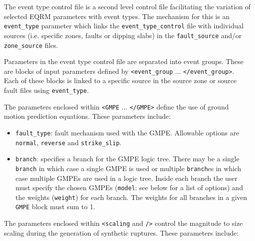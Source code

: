 The event type control file is a second level control file
facilitating the variation of selected EQRM parameters with event
types. The mechanism for this is an \texttt{event\_type} parameter
which links the \texttt{event\_type\_control} file with individual
sources (i.e. specific zones, faults or dipping slabs) in the
\texttt{fault\_source} and/or \texttt{zone\_source} files.


Parameters in the event type control file are separated into event
groups. These are blocks of input parameters defined by
\texttt{<event\_group} ... \texttt{</event\_group>}. Each of these
blocks is linked to a specific source in the source zone or source
fault files using \texttt{event\_type}.

The parameters enclosed within \texttt{<GMPE} ... \texttt{</GMPE>}
define the use of ground motion prediction equations. These
parameters include:
\begin{itemize}
\item \texttt{fault\_type}: fault mechanism used with the GMPE.
Allowable options are \texttt{normal}, \texttt{reverse} and
\texttt{strike\_slip}.
\item \texttt{branch}: specifies a branch for the GMPE logic tree.
There may be a single \texttt{branch} in which case a single GMPE is
used or multiple \texttt{branch}es in which case multiple GMPEs are
used in a logic tree. Inside each branch the user must specify the
chosen GMPEs (\texttt{model}: see below for a list of options) and
the weights (\texttt{weight}) for each branch. The weights
for all branches in a given \texttt{GMPE} block must sum to 1.
\end{itemize}

The parameters enclosed within \texttt{<scaling} and \texttt{/>}
 control the magnitude to size scaling during the generation of
 synthetic ruptures. These parameters include:


